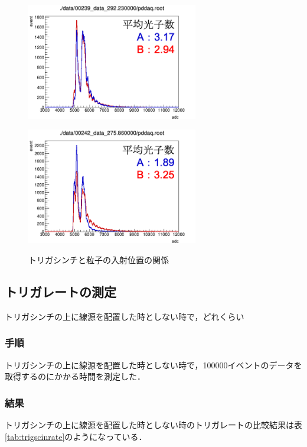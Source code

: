 \begin{figure}[h]
  \centering
  \begin{minipage}[b]{0.45\linewidth}
    \centering
    \includegraphics[width=7.5cm]{./figure/trigscinwlgcon.png}
    \label{fig:trigscinwlg}
  \end{minipage}
  \begin{minipage}[b]{0.45\linewidth}
    \centering
    \includegraphics[width=7.5cm]{./figure/trigscinwolgcon.png}
    \label{fig:trigscinwolg}
  \end{minipage}
  \caption{トリガシンチと粒子の入射位置の関係}
  \label{fig:trigscinlgcon}
\end{figure}



\subsection{トリガレートの測定}
トリガシンチの上に線源を配置した時としない時で，どれくらい
\subsubsection*{手順}
トリガシンチの上に線源を配置した時としない時で，100000イベントのデータを取得するのにかかる時間を測定した．

\subsubsection*{結果}
トリガシンチの上に線源を配置した時としない時のトリガレートの比較結果は表\ref{tab:trigscinrate}のようになっている．


